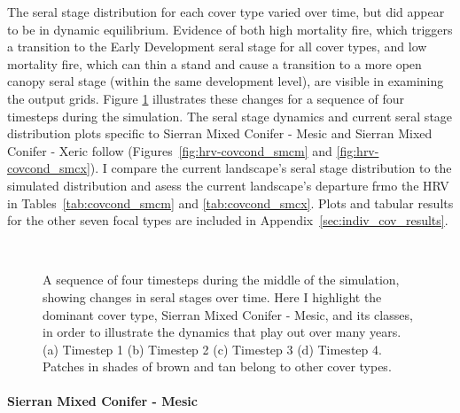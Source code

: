 The seral stage distribution for each cover type varied over time, but did appear to be in dynamic equilibrium. Evidence of both high mortality fire, which triggers a transition to the Early Development seral stage for all cover types, and low mortality fire, which can thin a stand and cause a transition to a more open canopy seral stage (within the same development level), are visible in examining the output grids. Figure \ref{fig:covcondmaps} illustrates these changes for a sequence of four timesteps during the simulation. The seral stage dynamics and current seral stage distribution plots specific to Sierran Mixed Conifer - Mesic and Sierran Mixed Conifer - Xeric follow (Figures~\ref{fig:hrv-covcond_smcm} and \ref{fig:hrv-covcond_smcx}). I compare the current landscape's seral stage distribution to the simulated distribution and asess the current landscape's departure frmo the HRV in Tables~\ref{tab:covcond_smcm} and \ref{tab:covcond_smcx}. Plots and tabular results for the other seven focal types are included in Appendix~\ref{sec:indiv_cov_results}.

\begin{figure}[!htbp]
  \centering
  \\%
  \caption{A sequence of four timesteps during the middle of the simulation, showing changes in seral stages over time. Here I highlight the dominant cover type, Sierran Mixed Conifer - Mesic, and its classes, in order to illustrate the dynamics that play out over many years. (a) Timestep 1 (b) Timestep 2 (c) Timestep 3 (d) Timestep 4. Patches in shades of brown and tan belong to other cover types.}
  \label{fig:covcondmaps}
\end{figure}


\clearpage

\paragraph*{Sierran Mixed Conifer - Mesic}

